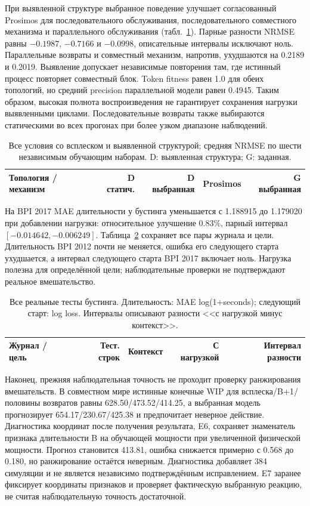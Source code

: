 \documentclass[runningheads]{llncs}
\begin{document}
При выявленной структуре выбранное поведение улучшает согласованный Prosimos для последовательного обслуживания, последовательного совместного механизма и параллельного обслуживания (табл.~\ref{tab:structure}). Парные разности NRMSE равны $-0.1987$, $-0.7166$ и $-0.0998$, описательные интервалы исключают ноль. Параллельные возвраты и совместный механизм, напротив, ухудшаются на 0.2189 и 0.2019. Выявление допускает независимые повторения там, где истинный процесс повторяет совместный блок. Token fitness равен 1.0 для обеих топологий, но средний precision параллельной модели равен 0.4945. Таким образом, высокая полнота воспроизведения не гарантирует сохранения нагрузки выявленными циклами. Последовательные возвраты также выбираются статическими во всех прогонах при более узком диапазоне наблюдений.
\begin{table}[t]
\caption{Все условия со всплеском и выявленной структурой; средняя NRMSE по шести независимым обучающим наборам. D: выявленная структура; G: заданная.}\label{tab:structure}
\centering\small\setlength{\tabcolsep}{4pt}
\begin{tabular}{lrrrr}\toprule
Топология / механизм & D статич. & D выбранная & Prosimos & G выбранная\\\midrule

\end{tabular}
\end{table}

На BPI 2017 MAE длительности у бустинга уменьшается с 1.188915 до 1.179020 при добавлении нагрузки: относительное улучшение 0.83\%, парный интервал $[-0.014642,-0.006249]$. Таблица~\ref{tab:real} сохраняет все пары журнала и цели. Длительность BPI 2012 почти не меняется, ошибка его следующего старта ухудшается, а интервал следующего старта BPI 2017 включает ноль. Нагрузка полезна для определённой цели; наблюдательные проверки не подтверждают реальное вмешательство.
\begin{table}[t]
\caption{Все реальные тесты бустинга. Длительность: MAE log(1+seconds); следующий старт: log loss. Интервалы описывают разности <<с нагрузкой минус контекст>>.}\label{tab:real}
\centering\small\setlength{\tabcolsep}{4pt}
\begin{tabular}{lrrrr}\toprule
Журнал / цель & Тест. строк & Контекст & С нагрузкой & Интервал разности\\\midrule

\end{tabular}
\end{table}

Наконец, прежняя наблюдательная точность не проходит проверку ранжирования вмешательств. В совместном мире истинные конечные WIP для всплеска/B+1/половины возвратов равны 628.50/473.52/414.25, а выбранная модель прогнозирует 654.17/230.67/425.38 и предпочитает неверное действие. Диагностика координат после получения результата, E6, сохраняет знаменатель признака длительности B на обучающей мощности при увеличенной физической мощности. Прогноз становится 413.81, ошибка снижается примерно с 0.568 до 0.180, но ранжирование остаётся неверным. Диагностика добавляет 384 симуляции и не является независимо подтверждённым исправлением. E7 заранее фиксирует координаты признаков и проверяет фактическую выбранную реакцию, не считая наблюдательную точность достаточной.
\end{document}
